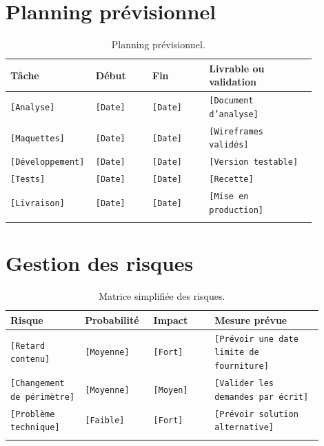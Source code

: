 \documentclass[11pt,a4paper]{report}
\newcommand{\placeholder}[1]{\textcolor{placeholderColor}{\texttt{[#1]}}}
\begin{document}
\section{Planning prévisionnel}
\begin{longtable}{p{0.18\linewidth}p{0.18\linewidth}p{0.18\linewidth}p{0.34\linewidth}}
\toprule
\textbf{Tâche} & \textbf{Début} & \textbf{Fin} & \textbf{Livrable ou validation} \\
\midrule
\endhead
\placeholder{Analyse} & \placeholder{Date} & \placeholder{Date} & \placeholder{Document d'analyse} \\
\placeholder{Maquettes} & \placeholder{Date} & \placeholder{Date} & \placeholder{Wireframes validés} \\
\placeholder{Développement} & \placeholder{Date} & \placeholder{Date} & \placeholder{Version testable} \\
\placeholder{Tests} & \placeholder{Date} & \placeholder{Date} & \placeholder{Recette} \\
\placeholder{Livraison} & \placeholder{Date} & \placeholder{Date} & \placeholder{Mise en production} \\
\bottomrule
\caption{Planning prévisionnel.}
\label{tab:planning}
\end{longtable}

\section{Gestion des risques}
\begin{longtable}{p{0.22\linewidth}p{0.18\linewidth}p{0.18\linewidth}p{0.32\linewidth}}
\toprule
\textbf{Risque} & \textbf{Probabilité} & \textbf{Impact} & \textbf{Mesure prévue} \\
\midrule
\endhead
\placeholder{Retard contenu} & \placeholder{Moyenne} & \placeholder{Fort} & \placeholder{Prévoir une date limite de fourniture} \\
\placeholder{Changement de périmètre} & \placeholder{Moyenne} & \placeholder{Moyen} & \placeholder{Valider les demandes par écrit} \\
\placeholder{Problème technique} & \placeholder{Faible} & \placeholder{Fort} & \placeholder{Prévoir solution alternative} \\
\bottomrule
\caption{Matrice simplifiée des risques.}
\label{tab:risques}
\end{longtable}

\end{document}
